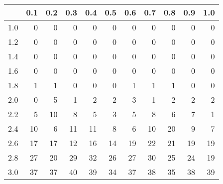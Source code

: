 \begin{tabular}{r|rrrrrrrrrr}
  \hline
 & 0.1 & 0.2 & 0.3 & 0.4 & 0.5 & 0.6 & 0.7 & 0.8 & 0.9 & 1.0 \\ 
  \hline
1.0 & 0 & 0 & 0 & 0 & 0 & 0 & 0 & 0 & 0 & 0 \\ 
  1.2 & 0 & 0 & 0 & 0 & 0 & 0 & 0 & 0 & 0 & 0 \\ 
  1.4 & 0 & 0 & 0 & 0 & 0 & 0 & 0 & 0 & 0 & 0 \\ 
  1.6 & 0 & 0 & 0 & 0 & 0 & 0 & 0 & 0 & 0 & 0 \\ 
  1.8 & 1 & 1 & 0 & 0 & 0 & 1 & 1 & 1 & 0 & 0 \\ 
  2.0 & 0 & 5 & 1 & 2 & 2 & 3 & 1 & 2 & 2 & 2 \\ 
  2.2 & 5 & 10 & 8 & 5 & 3 & 5 & 8 & 6 & 7 & 1 \\ 
  2.4 & 10 & 6 & 11 & 11 & 8 & 6 & 10 & 20 & 9 & 7 \\ 
  2.6 & 17 & 17 & 12 & 16 & 14 & 19 & 22 & 21 & 19 & 19 \\ 
  2.8 & 27 & 20 & 29 & 32 & 26 & 27 & 30 & 25 & 24 & 19 \\ 
  3.0 & 37 & 37 & 40 & 39 & 34 & 37 & 38 & 35 & 38 & 39 \\ 
   \hline
\end{tabular}
